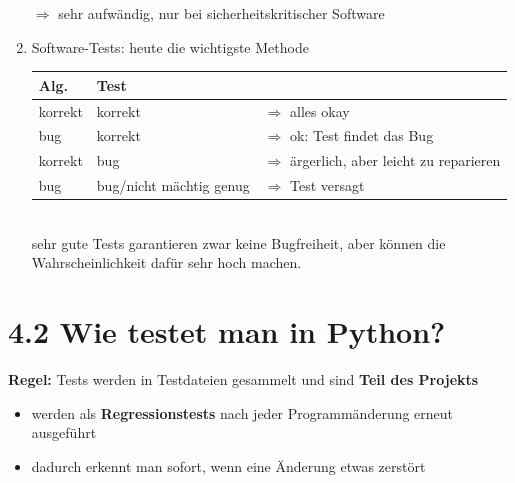 \documentclass[11pt, fleqn]{scrreprt}
\begin{document}
\begin{enumerate}
		$\Rightarrow$ sehr aufwändig, nur bei sicherheitskritischer Software
		\item Software-Tests: heute die wichtigste Methode \\
		\begin{tabular}{C{2cm} | C{4cm} L{5cm}}
			Alg. & Test & \\ \hline
			korrekt & korrekt & $\Rightarrow$ alles okay\\
			bug & korrekt & $\Rightarrow$ ok: Test findet das Bug\\
			korrekt & bug & $\Rightarrow$ ärgerlich, aber leicht zu reparieren\\
			bug & bug/nicht mächtig genug & $\Rightarrow$ Test versagt \\
		\end{tabular}\\
	
		sehr gute Tests garantieren zwar keine Bugfreiheit, aber können die Wahrscheinlichkeit dafür sehr hoch machen.
	\end{enumerate}

\section*{4.2 Wie testet man in Python?}
\textbf{Regel:} Tests werden in Testdateien gesammelt und sind \textbf{Teil des Projekts}
\begin{itemize}[label={$\Rightarrow$}]
	\item werden als \textbf{Regressionstests} nach jeder Programmänderung erneut ausgeführt
	\item dadurch erkennt man sofort, wenn eine Änderung etwas zerstört
\end{itemize}
\end{document}
